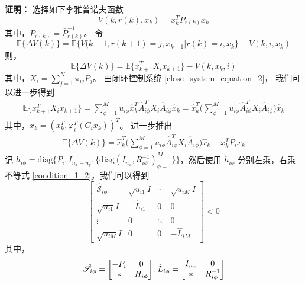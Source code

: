 	{\bf 证明：} 选择如下李雅普诺夫函数
	\begin{equation}\label{lyapunov_funciton} 
	V(k,r(k),x_k)=x^{T}_{k}P_{r(k)}x_{k}
	\end{equation}
	其中，$P_{r(k)}=\bar{P}^{-1}_{r(k)}$。 令 
	\begin{equation*}
		\mathbb{E}\{\varDelta V(k)\}=\mathbb{E}\{V(k+1,r(k+1)=j,x_{k+1}|r(k)=i,x_k \}-V(k,i,x_k)
	\end{equation*}
	则，
	\begin{equation} \label{lypfunction}
	\mathbb{E}\{\varDelta V(k)\}=\mathbb{E}\{x^{T}_{k+1}X_{i} x_{k+1} \}-V(k,x_k,i)
	\end{equation} 
	其中，$X_{i} = \sum_{j=1}^{N}\pi_{ij}P_{j}$。 由闭环控制系统 \eqref{close_system_equation_2}， 我们可以进一步得到
	\begin{equation}
	\begin{split}
	\mathbb{E}\{x^{T}_{k+1}X_{i} x_{k+1} \} = \sum_{\phi=1}^{M} u_{i\phi} \hat{x}^{T}_{k} \hat{A}^{T}_{i\phi}X_{i}\hat{A}_{i\phi}\hat{x}_{k} =\hat{x}^{T}_{k} \Big( \sum_{\phi=1}^{M}u_{i\phi}\hat{A}^{T}_{i\phi}X_{i}\hat{A}_{i\phi}\Big) \hat{x}_{k} 
	\end{split}
	\end{equation}
	其中，$\hat{x}_{k}=(x^{T}_k,\varphi^{T}_{i}(C_{i}x_{k}))^{T}$。 进一步推出
	\begin{equation} \label{leq18}
	\begin{split}
	\mathbb{E}\{\varDelta V(k)\}=\hat{x}^{T}_{k} \Big( \sum_{\phi=1}^{M}u_{i\phi}\hat{A}^{T}_{i\phi}X_{i}\hat{A}_{i\phi}\Big) \hat{x}_{k} -x^{T}_{k}P_{i}x_{k}
	\end{split}
	\end{equation}
	记 $h_{i\phi} = \mathrm{diag}\Big\{P_{i}, I_{n_x+n_y},\{\mathrm{diag}(I_{n_x},R^{-1}_{i\phi})^{M}_{\phi=1} \} \Big\}$，然后使用 $h_{i\phi}$ 分别左乘，右乘不等式 \eqref{condition_1_2}，我们可以得到
	\begin{equation}\label{st}
	\begin{bmatrix} 
	\hat{\mathscr{S}}_{i\phi}&
	\sqrt{u_{i1}}I&
	\cdots&
	\sqrt{u_{iM}}I\\
	\sqrt{u_{i1}}I&-\hat{L}_{i1}&0&0\\ 
	\vdots&0&\ddots&0\\
	\sqrt{u_{iM}}I&0&0&
	-\hat{L}_{iM}
	\end{bmatrix} <0
	\end{equation}
	其中，
	\begin{equation} \notag
	\begin{aligned}
	\hat{\mathscr{S}}_{i\phi}=\begin{bmatrix}
	-P_{i }&0\\
	*&H_{i\phi}
	\end{bmatrix},
	\hat{L}_{i\phi} = \begin{bmatrix}
	I_{n_x}&0\\
	*&R^{-1}_{i\phi}
	\end{bmatrix}
	\end{aligned}
	\end{equation}
